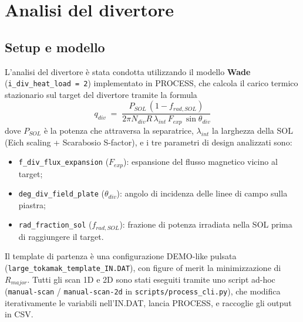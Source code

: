 
\section{Analisi del divertore}
\label{sec:divertor}

\subsection{Setup e modello}

L'analisi del divertore è stata condotta utilizzando il modello \textbf{Wade}
(\verb|i_div_heat_load = 2|) implementato in PROCESS, che calcola il carico
termico stazionario sul target del divertore tramite la formula
\begin{equation}
    q_{div}
    \;=\;
    \frac{P_{SOL}\,(1 - f_{rad,SOL})}
         {2\pi N_{div} R \,\lambda_{int}\, F_{exp}\, \sin\theta_{div}}
    \label{eq:wade}
\end{equation}
dove $P_{SOL}$ è la potenza che attraversa la separatrice, $\lambda_{int}$
la larghezza della SOL (Eich scaling + Scarabosio S-factor), e i tre
parametri di design analizzati sono:
\begin{itemize}
    \item \verb|f_div_flux_expansion| ($F_{exp}$): espansione del flusso
          magnetico vicino al target;
    \item \verb|deg_div_field_plate| ($\theta_{div}$): angolo di incidenza
          delle linee di campo sulla piastra;
    \item \verb|rad_fraction_sol| ($f_{rad,SOL}$): frazione di potenza
          irradiata nella SOL prima di raggiungere il target.
\end{itemize}

Il template di partenza è una configurazione DEMO-like pulsata
(\verb|large_tokamak_template_IN.DAT|), con figure of merit la
minimizzazione di $R_{major}$. Tutti gli scan 1D e 2D sono stati eseguiti
tramite uno script ad-hoc (\verb|manual-scan| / \verb|manual-scan-2d|
in \verb|scripts/process_cli.py|), che modifica iterativamente le variabili
nell'IN.DAT, lancia PROCESS, e raccoglie gli output in CSV.


